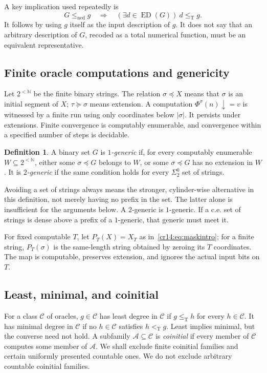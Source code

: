 \documentclass[11pt,a4paper]{article}
\newcommand{\N}{\mathbb N}
\newcommand{\leT}{\leq_{\mathrm T}}
\newcommand{\ltT}{<_{\mathrm T}}
\newcommand{\ned}{\mathrm{ned}}
\newcommand{\leN}{\leq_{\ned}}
\newcommand{\ED}{\operatorname{ED}}
\newcommand{\extends}{\succeq}
\newcommand{\prefix}{\preccurlyeq}
\theoremstyle{definition}
\newtheorem{definition}[theorem]{Definition}
\theoremstyle{remark}
\begin{document}
A key implication used repeatedly is
\begin{equation}\label{cr14:eq:representativecomputes}
 G\leN g\quad\Longrightarrow\quad
 (\exists d\in\ED(G))\ d\leT g.
\end{equation}
It follows by using $g$ itself as the input description of $g$. It does not
say that an arbitrary description of $G$, recoded as a total numerical
function, must be an equivalent representative.

\subsection{Finite oracle computations and genericity}
Let $2^{<\N}$ be the finite binary strings. The relation
$\sigma\prefix X$ means that $\sigma$ is an initial segment of $X$;
$\tau\extends\sigma$ means extension. A computation
$\Phi^\sigma(n)\downarrow=v$ is witnessed by a finite run using only
coordinates below $|\sigma|$. It persists under extensions. Finite
convergence is computably enumerable, and convergence within a specified
number of steps is decidable.

\begin{definition}
A binary set $G$ is \emph{$1$-generic} if, for every computably enumerable
$W\subseteq2^{<\N}$, either some $\sigma\prefix G$ belongs to $W$, or
some $\sigma\prefix G$ has no extension in $W$.
It is \emph{$2$-generic} if the same condition holds for every
$\Sigma^0_2$ set of strings.
\end{definition}

Avoiding a set of strings always means the stronger, cylinder-wise
alternative in this definition, not merely having no prefix in the set.
The latter alone is insufficient for the arguments below. A $2$-generic is
$1$-generic. If a c.e. set of strings is dense above a prefix of a $1$-generic,
that generic must meet it.

For fixed computable $T$, let $P_T(X)=X_T$ as in~\eqref{cr14:eq:maskintro};
for a finite string, $P_T(\sigma)$ is the same-length string obtained by
zeroing its $T$ coordinates. The map is computable, preserves extension,
and ignores the actual input bits on $T$.

\subsection{Least, minimal, and coinitial}
For a class $\mathcal C$ of oracles, $g\in\mathcal C$ has least degree in
$\mathcal C$ if $g\leT h$ for every $h\in\mathcal C$. It has minimal degree
in $\mathcal C$ if no $h\in\mathcal C$ satisfies $h\ltT g$.
Least implies minimal, but the converse need not hold. A subfamily
$\mathcal A\subseteq\mathcal C$ is \emph{coinitial} if every member of
$\mathcal C$ computes some member of $\mathcal A$.
We shall exclude finite coinitial families and certain uniformly presented
countable ones. We do not exclude arbitrary countable coinitial families.
\end{document}
